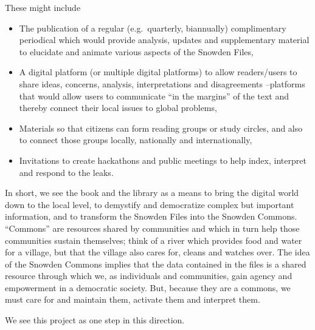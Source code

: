 \documentclass[a4paper,
fontsize=11pt,
oneside,
numbers=noperiodatend,
parskip=half-,
bibliography=totoc,
final
]{scrartcl}
\begin{document}
These might include

\begin{itemize}
\item
  The publication of a regular (e.g.~quarterly, biannually)
  complimentary periodical which would provide analysis, updates and
  supplementary material to elucidate and animate various aspects of the
  Snowden Files,
\item
  A digital platform (or multiple digital platforms) to allow
  readers/users to share ideas, concerns, analysis, interpretations and
  disagreements --platforms that would allow users to communicate
  \enquote{in the margins} of the text and thereby connect their local
  issues to global problems,
\item
  Materials so that citizens can form reading groups or study circles,
  and also to connect those groups locally, nationally and
  internationally,
\item
  Invitations to create hackathons and public meetings to help index,
  interpret and respond to the leaks.
\end{itemize}

In short, we see the book and the library as a means to bring the
digital world down to the local level, to demystify and democratize
complex but important information, and to transform the Snowden Files
into the Snowden Commons. \enquote{Commons} are resources shared by
communities and which in turn help those communities sustain themselves;
think of a river which provides food and water for a village, but that
the village also cares for, cleans and watches over. The idea of the
Snowden Commons implies that the data contained in the files is a shared
resource through which we, as individuals and communities, gain agency
and empowerment in a democratic society. But, because they are a
commons, we must care for and maintain them, activate them and interpret
them.

We see this project as one step in this direction.

\end{document}
